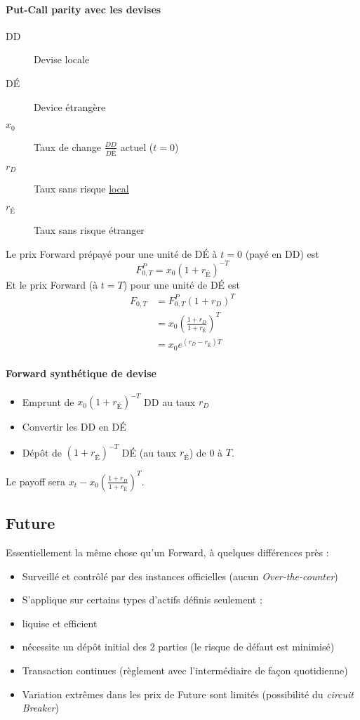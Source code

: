 \documentclass[10pt, french]{article}
\begin{document}
\begin{multicols*}{2}
\paragraph{Put-Call parity avec les devises}
\begin{description}
\item[DD] Devise locale
\item[DÉ] Device étrangère
\item[$x_0$] Taux de change $\frac{DD}{DÉ}$ actuel ($t=0$)
\item[$r_D$] Taux sans risque \underline{local}
\item[$r_{É}$] Taux sans risque étranger
\end{description}
Le prix Forward prépayé pour une unité de DÉ à $t =0$ (payé en DD) est
\[F_{0,T}^{P}  = x_0 \left(1 + r_{É} \right)^{-T} \]
Et le prix Forward (à $t = T$) pour une unité de DÉ est
\begin{align*}
F_{0,T} & = F_{0,T}^{P} \left(1+r_D \right)^{T} \\
& = x_0 \left(  \frac{1+r_D}{1+r_{É}}   \right)^{T}\\
&  = x_0 e^{(r_D - r_{É})T}
\end{align*}

\paragraph{Forward synthétique de devise}
\begin{itemize}
\item Emprunt de $x_0(1+r_{É})^{-T}$ DD au taux $r_D$
\item Convertir les DD en DÉ
\item Dépôt de $(1+r_{É})^{-T}$ DÉ (au taux $r_{É}$) de 0 à $T$.
\end{itemize}
Le payoff sera $x_t - x_0 \left(  \frac{1+r_D}{1+r_{É}}   \right)^{T}$.


\subsection*{Future}
Essentiellement la même chose qu'un Forward, à quelques différences près :
\begin{itemize}
\item Surveillé et contrôlé par des instances officielles (aucun \textit{Over-the-counter})
\item S'applique sur certains types d'actifs définis seulement ;
\item liquise et efficient
\item nécessite un dépôt initial des 2 parties (le risque de défaut est minimisé)
\item Transaction continues (règlement avec l'intermédiaire de façon quotidienne)
\item Variation extrêmes dans les prix de Future sont limités (possibilité du \textit{circuit Breaker})
\end{itemize}


\end{multicols*}
\end{document}

